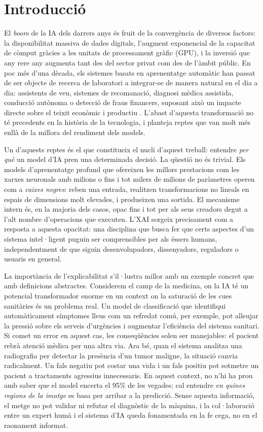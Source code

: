 \chapter{Introducció}

El \textit{boom} de la \ac{IA} dels darrers anys és fruit de la convergència de diversos factors: la disponibilitat massiva de dades digitals, l'augment exponencial de la capacitat de còmput gràcies a les unitats de processament gràfic (GPU), i la inversió que any rere any augmenta  tant des del sector privat com des de l'àmbit públic. En poc més d'una dècada, els sistemes basats en aprenentatge automàtic han passat de ser objecte de recerca de laboratori a integrar-se de manera natural en el dia a dia: assistents de veu, sistemes de recomanació, diagnosi mèdica assistida, conducció autònoma o detecció de fraus financers, suposant això un impacte directe sobre el teixit econòmic i productiu \cite{Arco25}. L'abast d'aquesta transformació no té precedents en la història de la tecnologia, i planteja reptes que van molt més enllà de la millora del rendiment dels models.

Un d'aquests reptes és el que constitueix el nucli d'aquest treball: entendre \emph{per què} un model d'IA pren una determinada decisió. La qüestió no és trivial. Els models d'aprenentatge profund que ofereixen les millors prestacions com les xarxes neuronals amb milions o fins i tot milers de milions de paràmetres operen com a \emph{caixes negres}: reben una entrada, realitzen transformacions no lineals en espais de dimensions molt elevades, i produeixen una sortida. El mecanisme intern és, en la majoria dels casos, opac fins i tot per als seus creadors degut a l'alt nombre d'operacions que executen. L'\ac{XAI} sorgeix precisament com a resposta a aquesta opacitat: una disciplina que busca fer que certs aspectes d'un sistema intel·ligent puguin ser comprensibles per als éssers humans, independentment de que siguin desenvolupadors, dissenyadors, reguladors o usuaris en general.

La importància de l'explicabilitat s'il·lustra millor amb un exemple concret que amb definicions abstractes. Considerem el camp de la medicina, on la \ac{IA} té un potencial transformador enorme en un context on la saturació de les cues sanitàries és un problema real. Un model de classificació que identifiqui automàticament símptomes lleus com un refredat comú, per exemple, pot alleujar la pressió sobre els serveis d'urgències i augmentar l'eficiència del sistema sanitari. Si comet un error en aquest cas, les conseqüències solen ser manejables: el pacient rebrà atenció mèdica per una altra via. Ara bé, quan el sistema analitza una radiografia per detectar la presència d'un tumor maligne, la situació canvia radicalment. Un fals negatiu pot costar una vida i un fals positiu pot sotmetre un pacient a tractaments agressius innecessaris. En aquest context, no n'hi ha prou amb saber que el model encerta el 95\% de les vegades; cal entendre \emph{en quines regions de la imatge} es basa per arribar a la predicció. Sense aquesta informació, el metge no pot validar ni refutar el diagnòstic de la màquina, i la col·laboració entre un expert humà i el sistema d'IA queda fonamentada en la fe cega, no en el raonament informat.

